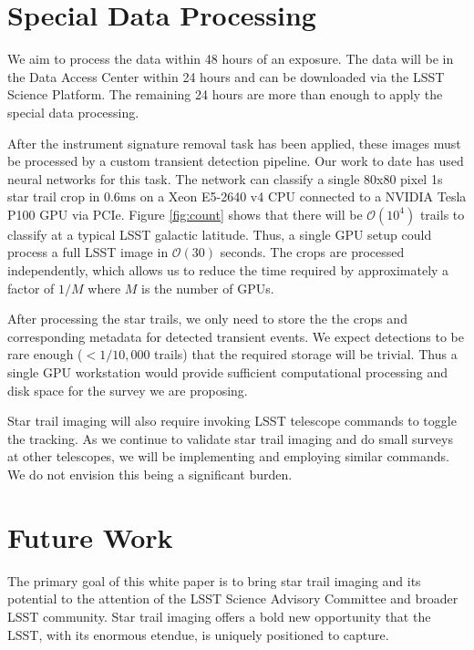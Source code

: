 \documentclass[12pt, letterpaper]{article}
\begin{document}
\vspace{.6in}

\section{Special Data Processing}

We aim to process the data within 48 hours of an exposure. The data will be in the Data Access Center within 24 hours and can be downloaded via the LSST Science Platform. The remaining 24 hours are more than enough to apply the special data processing.

After the instrument signature removal task has been applied, these images must be processed by a custom transient detection pipeline. Our work to date has used neural networks for this task. The network can classify a single 80x80 pixel 1s star trail crop in 0.6ms on a Xeon E5-2640 v4 CPU connected to a NVIDIA Tesla P100 GPU via PCIe. Figure \ref{fig:count} shows that there will be $\mathcal{O}(10^4)$ trails to classify at a typical LSST galactic latitude. Thus, a single GPU setup could process a full LSST image in $\mathcal{O}(30)$ seconds. The crops are processed independently, which allows us to reduce the time required by approximately a factor of $1/M$ where $M$ is the number of GPUs.  

After processing the star trails, we only need to store the the crops and corresponding metadata for detected transient events. We expect detections to be rare enough ($< 1/10,000$ trails) that the required storage will be trivial. Thus a single GPU workstation would provide sufficient computational processing and disk space for the survey we are proposing.

Star trail imaging will also require invoking LSST telescope commands to toggle the tracking. As we continue to validate star trail imaging and do small surveys at other telescopes, we will be implementing and employing similar commands. We do not envision this being a significant burden.

\section{Future Work}
\label{sec:future}

The primary goal of this white paper is to bring star trail imaging and its potential to the attention of the LSST Science Advisory Committee and broader LSST community. Star trail imaging offers a bold new opportunity that the LSST, with its enormous etendue, is uniquely positioned to capture. 
\end{document}
